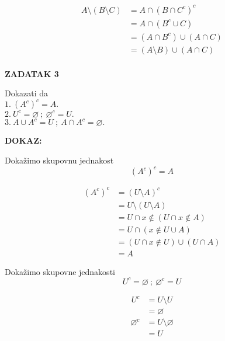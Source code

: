\documentclass{article}
\begin{document}
            \begin{align*}
                A\setminus (B\setminus C) &= A\cap (B\cap C^c)^c\tag{jer je $X\setminus Y=X\cap Y^c$} \\
                                          &= A\cap (B^c\cup C)\tag{osobine komplementa}\\
                                          &= (A\cap B^c)\cup (A\cap C)\tag{DeMorganovi zakoni}\\
                                          &= (A\setminus B)\cup (A\cap C)\tag{$X\setminus Y=X\cap Y^c$}\\
            \end{align*}
    \newpage\noindent\thispagestyle{empty}
    \begin{flushleft}
    
        \textbf{ZADATAK 3}\\
        \bigskip
        
        Dokazati da\\
        $1.\ (A^c)^c=A.$\\
        $2.\ U^c=\varnothing \ ;\ \varnothing ^c=U.$\\
        $3.\ A\cup A^c=U\ ;\ A\cap A^c=\varnothing.$
        \bigskip
        
        \textbf{DOKAZ:}
    \end{flushleft}

    \noindent
    Dokažimo skupovnu jednakost
    $$(A^c)^c=A$$

    \begin{align*}
        (A^c)^c &= (U\setminus A)^c\tag{jer jer $X^c=U\setminus X$}\\
                &= U\setminus (U\setminus A)\tag{$X^c=U\setminus X$}\\
                &= U\cap x\notin (U\cap x\notin A)\tag{$X\setminus Y=X\cap x\notin Y$}\\
                &= U\cap (x\notin U\cup A)\tag{djelovanje negacije}\\
                &= (U\cap x\notin U)\cup (U\cap A)\tag{$U\cap x\notin U = \varnothing,\ U\cap A = A$}\\
                &= A
    \end{align*}
    \medskip

    \noindent
    Dokažimo skupovne jednakosti
    $$U^c=\varnothing\ ;\ \varnothing ^c=U$$

    \begin{align*}
        U^c &= U\setminus U\tag{$X^c=U\setminus X$}\\
            &= \varnothing
    \end{align*}
    \begin{align*}
        \varnothing ^c &= U\setminus \varnothing\tag{$X^c=U\setminus X$}\\
                       &= U
    \end{align*}
    \medskip
\end{document}
